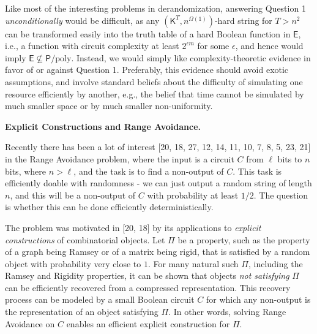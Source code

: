\documentclass[10pt,a4paper]{article}
\begin{document}
Like most of the interesting problems in derandomization, answering Question 1 \emph{unconditionally} would be difficult, as any $({\mathsf{K}}^{T},n^{\Omega(1)})$-hard string for $T>n^{2}$ can be transformed easily into the truth table of a hard Boolean function in ${\mathsf{E}}$, i.e., a function with circuit complexity at least $2^{\epsilon m}$ for some $\epsilon$, and hence would imply ${\mathsf{E}}\not\subseteq{\mathsf{P}}/\mathrm{poly}$.
Instead, we would simply like complexity-theoretic evidence in favor of or against Question 1. Preferably, this evidence should avoid exotic assumptions, and involve standard beliefs about the difficulty of simulating one resource efficiently by another, e.g., the belief that time cannot be simulated by much smaller space or by much smaller non-uniformity.\par





\par\medskip\noindent\textbf{Explicit Constructions and Range Avoidance.}\par




Recently there has been a lot of interest [20, 18, 27, 12, 14, 11, 10, 7, 8, 5, 23, 21] in the Range Avoidance problem, where the input is a circuit $C$ from $\ell$ bits to $n$ bits, where $n>\ell$, and the task is to find a non-output of $C$. This task is efficiently doable with randomness - we can just output a random string of length $n$, and this will be a non-output of $C$ with probability at least $1/2$. The question is whether this can be done efficiently deterministically.\par




The problem was motivated in [20, 18] by its applications to \emph{explicit constructions} of combinatorial objects. Let $\Pi$ be a property, such as the property of a graph being Ramsey or of a matrix being rigid, that is satisfied by a random object with probability very close to $1$. For many natural such $\Pi$, including the Ramsey and Rigidity properties, it can be shown that objects \emph{not satisfying} $\Pi$ can be efficiently recovered from a compressed representation. This recovery process can be modeled by a small Boolean circuit $C$ for which any non-output is the representation of an object satisfying $\Pi$. In other words, solving Range Avoidance on $C$
enables an efficient explicit construction for $\Pi$.\par
\end{document}
